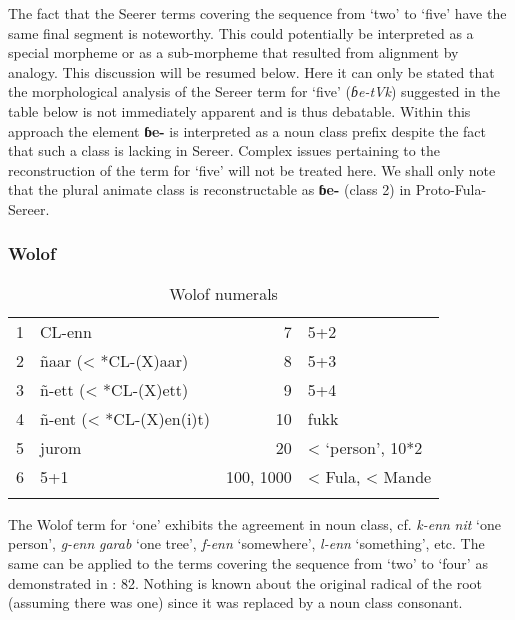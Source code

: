 The fact that the Seerer terms covering the sequence from ‘two’ to ‘five’ have the same final segment is noteworthy. This could potentially be interpreted as a special morpheme or as a sub-morpheme that resulted from alignment by analogy. This discussion will be resumed below. Here it can only be stated that the morphological analysis of the Sereer term for ‘five’ (\textit{ɓe-tVk}) suggested in the table below is not immediately apparent and is thus debatable. Within this approach the element \textbf{ɓe-} is interpreted as a noun class prefix despite the fact that such a class is lacking in Sereer. Complex issues pertaining to the reconstruction of the term for ‘five’ will not be treated here. We shall only note that the plural animate class is reconstructable as \textbf{ɓe-} (class 2) in Proto-Fula-Sereer. 

\subsubsection{Wolof}%
\begin{table}
\caption{\label{tab:3:227}Wolof numerals}


\begin{tabularx}{\textwidth}{lQrQ}
\lsptoprule

1 & CL-enn & 7 & 5+2\\
2 & ñaar (< *CL-(X)aar) & 8 & 5+3\\
3 & ñ-ett (< *CL-(X)ett) & 9 & 5+4\\
4 & ñ-ent (< *CL-(X)en(i)t) & 10 & fukk\\
5 & jurom & 20 & < `person', 10*2\\
6 & 5+1 & 100, 1000 & < Fula, < Mande\\
\lspbottomrule
\end{tabularx}
\end{table}

The Wolof term for ‘one’ exhibits the agreement in noun class, cf. \textit{k-enn} \textit{nit} ‘one person’, \textit{g-enn} \textit{garab} ‘one tree’, \textit{f-enn} ‘somewhere’, \textit{l-enn} ‘something’, etc. The same can be applied to the terms covering the sequence from ‘two’ to ‘four’ as demonstrated in \citealt{Pozdniakov2015}: 82. Nothing is known about the original radical of the root (assuming there was one) since it was replaced by a noun class consonant.

